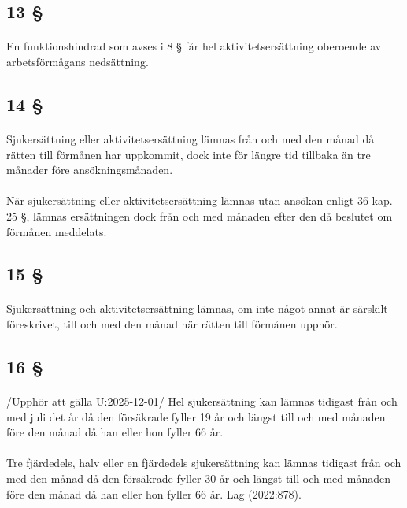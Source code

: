 \documentclass[a4paper,notitlepage,openany,10pt]{book}
\begin{document}
\subsection*{13 §}
\paragraph*{}
En funktionshindrad som avses i 8 § får hel aktivitetsersättning oberoende av arbetsförmågans nedsättning.
\subsection*{14 §}
\paragraph*{}
Sjukersättning eller aktivitetsersättning lämnas från och med den månad då rätten till förmånen har uppkommit, dock inte för längre tid tillbaka än tre månader före ansökningsmånaden.
\paragraph*{}
När sjukersättning eller aktivitetsersättning lämnas utan ansökan enligt 36 kap. 25 §, lämnas ersättningen dock från och med månaden efter den då beslutet om förmånen meddelats.
\subsection*{15 §}
\paragraph*{}
Sjukersättning och aktivitetsersättning lämnas, om inte något annat är särskilt föreskrivet, till och med den månad när rätten till förmånen upphör.
\subsection*{16 §}
\paragraph*{}
/Upphör att gälla U:2025-12-01/
Hel sjukersättning kan lämnas tidigast från och med juli det år då den försäkrade fyller 19 år och längst till och med månaden före den månad då han eller hon fyller 66 år.
\paragraph*{}
Tre fjärdedels, halv eller en fjärdedels sjukersättning kan lämnas tidigast från och med den månad då den försäkrade fyller 30 år och längst till och med månaden före den månad då han eller hon fyller 66 år.
Lag (2022:878).
\end{document}
